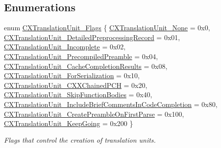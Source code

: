 \subsection*{Enumerations}
\begin{DoxyCompactItemize}
\item 
enum \hyperlink{group__CINDEX__TRANSLATION__UNIT_gab1e4965c1ebe8e41d71e90203a723fe9}{C\+X\+Translation\+Unit\+\_\+\+Flags} \{ \newline
\hyperlink{group__CINDEX__TRANSLATION__UNIT_ggab1e4965c1ebe8e41d71e90203a723fe9afdea7f108d517d6e212d762e41a48480}{C\+X\+Translation\+Unit\+\_\+\+None} = 0x0, 
\hyperlink{group__CINDEX__TRANSLATION__UNIT_ggab1e4965c1ebe8e41d71e90203a723fe9a9e1dd69c4a2ff7954dca8df41a63c0e6}{C\+X\+Translation\+Unit\+\_\+\+Detailed\+Preprocessing\+Record} = 0x01, 
\hyperlink{group__CINDEX__TRANSLATION__UNIT_ggab1e4965c1ebe8e41d71e90203a723fe9ad7cfbf9284a37c4324fc86fc7e4bcfc1}{C\+X\+Translation\+Unit\+\_\+\+Incomplete} = 0x02, 
\hyperlink{group__CINDEX__TRANSLATION__UNIT_ggab1e4965c1ebe8e41d71e90203a723fe9a790e560dd51389cb9dc370fe40ba60f8}{C\+X\+Translation\+Unit\+\_\+\+Precompiled\+Preamble} = 0x04, 
\newline
\hyperlink{group__CINDEX__TRANSLATION__UNIT_ggab1e4965c1ebe8e41d71e90203a723fe9a050d92c8ce5d72b25d0993025bdf5be8}{C\+X\+Translation\+Unit\+\_\+\+Cache\+Completion\+Results} = 0x08, 
\hyperlink{group__CINDEX__TRANSLATION__UNIT_ggab1e4965c1ebe8e41d71e90203a723fe9a9a020ecb5e423aa440802c02551ce667}{C\+X\+Translation\+Unit\+\_\+\+For\+Serialization} = 0x10, 
\hyperlink{group__CINDEX__TRANSLATION__UNIT_ggab1e4965c1ebe8e41d71e90203a723fe9a442818d0c34982dd0737deb62a6db397}{C\+X\+Translation\+Unit\+\_\+\+C\+X\+X\+Chained\+P\+CH} = 0x20, 
\hyperlink{group__CINDEX__TRANSLATION__UNIT_ggab1e4965c1ebe8e41d71e90203a723fe9acdefcb715af5ab334f99508163135df0}{C\+X\+Translation\+Unit\+\_\+\+Skip\+Function\+Bodies} = 0x40, 
\newline
\hyperlink{group__CINDEX__TRANSLATION__UNIT_ggab1e4965c1ebe8e41d71e90203a723fe9af43ae6fc616cdbc78575344dc984b24c}{C\+X\+Translation\+Unit\+\_\+\+Include\+Brief\+Comments\+In\+Code\+Completion} = 0x80, 
\hyperlink{group__CINDEX__TRANSLATION__UNIT_ggab1e4965c1ebe8e41d71e90203a723fe9aa27840716b90a9346019c9f0914f9ab8}{C\+X\+Translation\+Unit\+\_\+\+Create\+Preamble\+On\+First\+Parse} = 0x100, 
\hyperlink{group__CINDEX__TRANSLATION__UNIT_ggab1e4965c1ebe8e41d71e90203a723fe9afda3272e16e2aa499fc265615991f968}{C\+X\+Translation\+Unit\+\_\+\+Keep\+Going} = 0x200
 \}\begin{DoxyCompactList}\small\item\em Flags that control the creation of translation units. \end{DoxyCompactList}

\end{DoxyCompactItemize}
